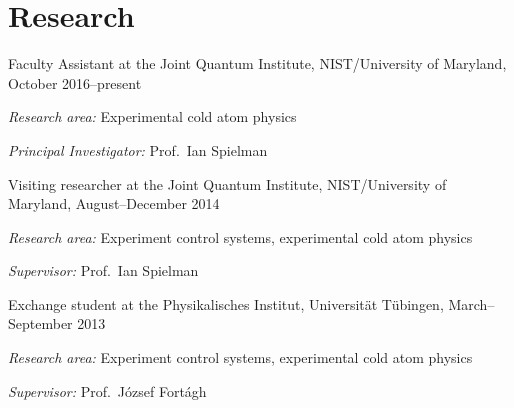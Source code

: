 \documentclass[10pt,letterpaper]{article}
\renewenvironment{itemize}{
  \begin{list}{}{
    \setlength{\leftmargin}{1.5em}
    \setlength{\itemsep}{0.25em}
    \setlength{\parskip}{0pt}
    \setlength{\parsep}{0.25em}
  }
}{
  \end{list}
}
\begin{document}
\section*{Research}
\begin{itemize}

\item{Faculty Assistant at the Joint Quantum Institute, NIST/University of Maryland, October 2016--present}
    \begin{itemize}
      \item \textit{Research area:}
      Experimental cold atom physics
      \item \textit{Principal Investigator:}
      Prof.~Ian Spielman
    \end{itemize}

\item{Visiting researcher at the Joint Quantum Institute, NIST/University of Maryland, August--December 2014}
    \begin{itemize}
      \item \textit{Research area:}
      Experiment control systems, experimental cold atom physics
      \item \textit{Supervisor:}
      Prof.~Ian Spielman
    \end{itemize}

\item{Exchange student at the Physikalisches Institut, Universität Tübingen, March–September 2013}
    \begin{itemize}
      \item \textit{Research area:}
      Experiment control systems, experimental cold atom physics
      \item \textit{Supervisor:}
      Prof.~József Fortágh
    \end{itemize}
    

\end{itemize}
\end{document}
